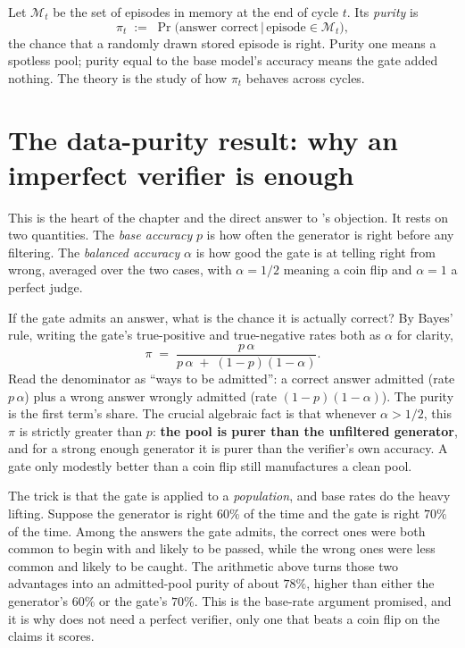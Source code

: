 \begin{precise}
Let $\mathcal{M}_t$ be the set of episodes in memory at the end of cycle $t$. Its
\emph{purity} is
\[
  \pi_t \;:=\; \Pr\big(\text{answer correct} \,\big|\, \text{episode} \in \mathcal{M}_t\big),
\]
the chance that a randomly drawn stored episode is right. Purity one means a spotless
pool; purity equal to the base model's accuracy means the gate added nothing. The
theory is the study of how $\pi_t$ behaves across cycles.
\end{precise}

\section{The data-purity result: why an imperfect verifier is enough}
\label{sec:theory-purity}

This is the heart of the chapter and the direct answer to 's objection.
It rests on two quantities. The \emph{base accuracy} $p$ is how often the generator is
right before any filtering. The \emph{balanced accuracy} $\alpha$ is how good the gate is
at telling right from wrong, averaged over the two cases, with $\alpha = 1/2$ meaning a
coin flip and $\alpha = 1$ a perfect judge.

\begin{precise}
If the gate admits an answer, what is the chance it is actually correct? By Bayes' rule,
writing the gate's true-positive and true-negative rates both as $\alpha$ for clarity,
\[
  \pi \;=\; \frac{p\,\alpha}{p\,\alpha \;+\; (1-p)(1-\alpha)}.
\]
Read the denominator as ``ways to be admitted'': a correct answer admitted (rate
$p\,\alpha$) plus a wrong answer wrongly admitted (rate $(1-p)(1-\alpha)$). The purity is
the first term's share. The crucial algebraic fact is that whenever $\alpha > 1/2$, this
$\pi$ is strictly greater than $p$: \textbf{the pool is purer than the unfiltered
generator}, and for a strong enough generator it is purer than the verifier's own
accuracy. A gate only modestly better than a coin flip still manufactures a clean pool.
\end{precise}

\begin{intuition}
The trick is that the gate is applied to a \emph{population}, and base rates do the heavy
lifting. Suppose the generator is right $60\%$ of the time and the gate is right $70\%$ of
the time. Among the answers the gate admits, the correct ones were both common to begin
with and likely to be passed, while the wrong ones were less common and likely to be
caught. The arithmetic above turns those two advantages into an admitted-pool purity of
about $78\%$, higher than either the generator's $60\%$ or the gate's $70\%$. This is the
base-rate argument  promised, and it is why \caem{} does not need a
perfect verifier, only one that beats a coin flip on the claims it scores.
\end{intuition}

